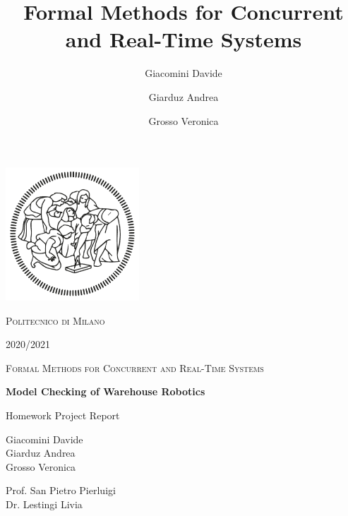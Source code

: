 \documentclass[12pt,oneside,a4paper]{article}
\title{Formal Methods for Concurrent and Real-Time Systems}
\author{Giacomini Davide \and Giarduz Andrea \and Grosso Veronica}
\begin{document}
\begin{titlepage}
\begin{center}
        \vspace*{-1,5cm}
		\includegraphics[width=5cm]{resources/logo.png}
		
        \LARGE{{\scshape Politecnico di Milano}}
        
        \LARGE{}
        
        \LARGE{2020/2021}
        
        \vspace*{1cm}
        \Large{{\scshape Formal Methods for Concurrent and Real-Time Systems}}
        
        \vspace*{1cm}
        \Huge{\textbf{Model Checking of Warehouse Robotics}}
 
 		\Large{Homework Project Report}
        \vfill
        
        \vspace*{0,8cm}
        \Large{Giacomini Davide\\
        Giarduz Andrea\\
        Grosso Veronica
        }
            
        \vspace{1,2cm}
           
        \Large
        Prof. San Pietro Pierluigi\\
        Dr. Lestingi Livia
    \end{center}
\end{titlepage}

\setcounter{tocdepth}{3}
\tableofcontents

\newpage

\listoffigures
{}
\listoftables
{}

\newpage
{}





\end{document}
